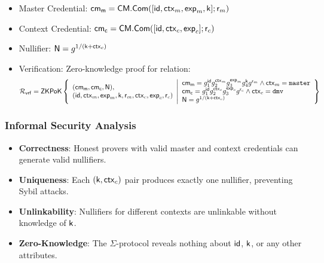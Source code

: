 \begin{itemize}
    \item Master Credential: $\mathsf{cm_m} = \mathsf{CM.Com}([\mathsf{id}, \mathsf{ctx}_m, \mathsf{exp}_m, \mathsf{k}]; \mathsf{r}_m)$ 
    \item Context Credential: $\mathsf{cm_c} = \mathsf{CM.Com}([\mathsf{id}, \mathsf{ctx}_c, \mathsf{exp}_c]; \mathsf{r}_c)$
    \item Nullifier: $\mathsf{N} = g^{1/(\mathsf{k} + \mathsf{ctx}_c)}$
    \item Verification: Zero-knowledge proof for relation:
    \[
    \mathcal{R}_{\mathsf{vrf}} = {\mathsf{ZKPoK}} \left\{ 
    \begin{array}{l} 
    (\mathsf{cm_m}, \mathsf{cm_c}, \mathsf{N}), \\
    (\mathsf{id}, \mathsf{ctx}_m, \mathsf{exp}_m, \mathsf{k}, \mathsf{r}_m, \mathsf{ctx}_c, \mathsf{exp}_c, \mathsf{r}_c) \\
    \end{array} 
    \middle|
    \begin{array}{l}
        \mathsf{cm_m} = g_1^{\mathsf{id}}g_2^{\mathsf{ctx}_m}g_3^{\mathsf{exp}_m}g_4^{\mathsf{k}}g^{\mathsf{r}_m}  \wedge \mathsf{ctx}_m=\texttt{master} \\
        \mathsf{cm_c} = g_1^{\mathsf{id}}g_2^{\mathsf{ctx}_c}g_3^{\mathsf{exp}_c}g^{\mathsf{r}_c} \wedge \mathsf{ctx}_c=\texttt{dmv} \\
        \mathsf{N} = g^{1/(\mathsf{k} + \mathsf{ctx}_c)}
    \end{array} 
    \right\}
    \]
\end{itemize}

\subsubsection{Informal Security Analysis}
\begin{itemize}
    \item \textbf{Correctness}: Honest provers with valid master and context credentials can generate valid nullifiers.
    \item \textbf{Uniqueness}: Each $(\mathsf{k},\mathsf{ctx}_c)$ pair produces exactly one nullifier, preventing Sybil attacks.
    \item \textbf{Unlinkability}: Nullifiers for different contexts are unlinkable without knowledge of $\mathsf{k}$.
    \item \textbf{Zero-Knowledge}: The $\Sigma$-protocol reveals nothing about $\mathsf{id}$, $\mathsf{k}$, or any other attributes.
\end{itemize}

